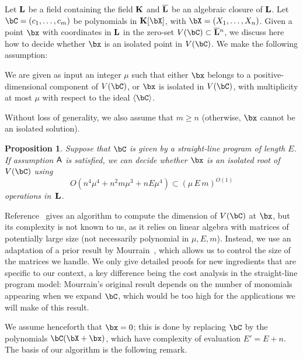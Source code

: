 \documentclass[12pt]{article}
\newtheorem{proposition}[definition]{Proposition}
\begin{document}
Let $\mathbf{L}$ be a field containing the field $\mathbf{K}$ and $\overline{\mathbf{L}}$ be an
algebraic closure of $\mathbf{L}$.  Let $\bC=(c_1,\dots,c_m)$ be polynomials
in $\KK[\bX]$, with $\bX=(X_1,\dots,X_n)$. Given a point $\bx$ with
coordinates in $\mathbf{L}$ in the zero-set $V(\bC)\subset \LLbar{}^n$, we
discuss here how to decide whether $\bx$ is an isolated point in
$V(\bC)$. We make the following assumption:
\begin{description}[leftmargin=*]
\item [$\assH.$] We are given as input an integer $\mu$ such that
 either $\bx$ belongs to a positive-dimensional component of $V(\bC)$,
 or $\bx$ is isolated in $V(\bC)$, with multiplicity at most $\mu$
  with respect to the ideal $\langle \bC\rangle$.
\end{description}
Without loss of generality, we also assume that $m\ge n$ (otherwise, $\bx$
cannot be an isolated solution). 
\begin{proposition}\label{prop:testisolated}
  Suppose that $\bC$ is given by a straight-line program of length $E$.
  If assumption $\mathsf{A}$ is satisfied, we can decide whether $\bx$ is an
  isolated root of $V(\bC)$ using 
$$O(n^4 \mu^4 + n^2 m \mu^3 + n E \mu^4) \subset (\mu\,E\,m)^{O(1)}$$ operations in~$\mathbf{L}$.
\end{proposition}
Reference~\cite{BaHaPeSo09} gives an algorithm to compute the
dimension of $V(\bC)$ at $\bx$, but its complexity is not known to us,
as it relies on linear algebra with matrices of potentially large size
(not necessarily polynomial in $\mu,E,m$).  Instead, we use an
adaptation of a prior result by Mourrain~\cite{Mourrain97}, which
allows us to control the size of the matrices we handle. We only give
detailed proofs for new ingredients that are specific to our context,
a key difference being the cost analysis in the straight-line program
model: Mourrain's original result depends on the number of monomials
appearing when we expand $\bC$, which would be too high for the
applications we will make of this result.

We assume henceforth that $\bx=0$; this is
done by replacing $\bC$ by the polynomials $\bC(\bX+\bx)$, which have
complexity of evaluation $E'=E+n$.  The basis of our algorithm is the
following remark.
\end{document}
